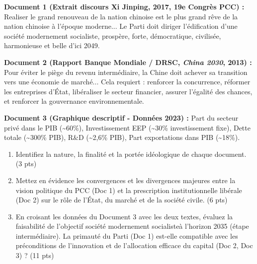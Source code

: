 \documentclass[11pt]{article}
\begin{document}
\begin{exercice}
\noindent \textbf{Document 1 (Extrait discours Xi Jinping, 2017, 19e Congrès PCC) :} \og Realiser le grand renouveau de la nation chinoise est le plus grand rêve de la nation chinoise à l'époque moderne... Le Parti doit diriger l'édification d'une société modernement socialiste, prospère, forte, démocratique, civilisée, harmonieuse et belle d'ici 2049.\fg

\noindent \textbf{Document 2 (Rapport Banque Mondiale / DRSC, \textit{China 2030}, 2013) :} \og Pour éviter le piège du revenu intermédiaire, la Chine doit achever sa transition vers une économie de marché... Cela requiert : renforcer la concurrence, réformer les entreprises d'État, libéraliser le secteur financier, assurer l'égalité des chances, et renforcer la gouvernance environnementale.\fg

\noindent \textbf{Document 3 (Graphique descriptif - Données 2023) :} Part du secteur privé dans le PIB (\textasciitilde 60\%), Investissement EEP (\textasciitilde 30\% investissement fixe), Dette totale (\textasciitilde 300\% PIB), R\&D (\textasciitilde 2,6\% PIB), Part exportations dans PIB (\textasciitilde 18\%).
\begin{enumerate}
    \item Identifiez la nature, la finalité et la portée idéologique de chaque document. (3 pts)
    \item Mettez en évidence les convergences et les divergences majeures entre la vision politique du PCC (Doc 1) et la prescription institutionnelle libérale (Doc 2) sur le rôle de l'État, du marché et de la société civile. (6 pts)
    \item En croisant les données du Document 3 avec les deux textes, évaluez la faisabilité de l'objectif \og société modernement socialiste\fg à l'horizon 2035 (étape intermédiaire). La primauté du Parti (Doc 1) est-elle compatible avec les préconditions de l'innovation et de l'allocation efficace du capital (Doc 2, Doc 3) ? (11 pts)
\end{enumerate}
\end{exercice}
\end{document}
